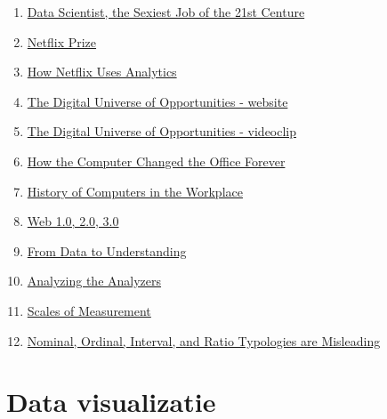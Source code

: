 \documentclass[]{tufte-book}
\providecommand{\tightlist}{%
  \setlength{\itemsep}{0pt}\setlength{\parskip}{0pt}}
\begin{document}
\begin{enumerate}
\def\labelenumi{\arabic{enumi}.}
\tightlist
\item
  \href{https://hbr.org/2012/10/data-scientist-the-sexiest-job-of-the-21st-century}{Data Scientist, the Sexiest Job of the 21st Centure}
\item
  \href{https://en.wikipedia.org/wiki/Netflix_Prize}{Netflix Prize}
\item
  \href{https://blog.kissmetrics.com/how-netflix-uses-analytics/}{How Netflix Uses Analytics}
\item
  \href{https://www.emc.com/leadership/digital-universe/2014iview/index.htm}{The Digital Universe of Opportunities - website}
\item
  \href{http://bcove.me/9s38pkjm}{The Digital Universe of Opportunities - videoclip}
\item
  \href{http://www.bbc.com/news/magazine-23509153}{How the Computer Changed the Office Forever}
\item
  \href{http://www.ehow.com/about_6362639_history-computers-workplace.html}{History of Computers in the Workplace}
\item
  \href{https://www.geeksforgeeks.org/web-1-0-web-2-0-and-web-3-0-with-their-difference/}{Web 1.0, 2.0, 3.0}
\item
  \href{https://en.wikipedia.org/wiki/File:DIKW_(1).png}{From Data to Understanding}
\item
  \href{http://www.oreilly.com/data/free/files/analyzing-the-analyzers.pdf}{Analyzing the Analyzers}
\item
  \href{http://www.mnestudies.com/research/scales-measurement}{Scales of Measurement}
\item
  \href{http://websites.uwlax.edu/tbrooks/eco307/handouts/velleman\%201993\%20-\%20typologies\%20misleading.pdf}{Nominal, Ordinal, Interval, and Ratio Typologies are Misleading}
\end{enumerate}

\hypertarget{data-visualizatie}{%
\chapter{Data visualizatie}\label{data-visualizatie}}
\end{document}
